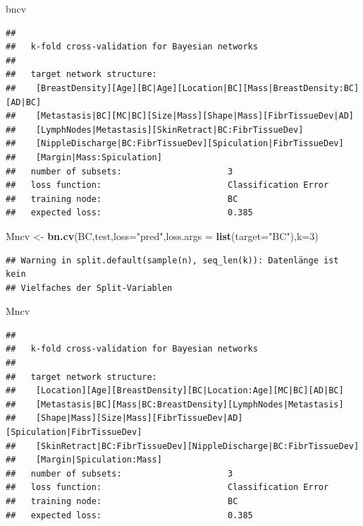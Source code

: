 \documentclass[]{article}
\newenvironment{Shaded}{\begin{snugshade}}{\end{snugshade}}
\newcommand{\KeywordTok}[1]{\textcolor[rgb]{0.13,0.29,0.53}{\textbf{{#1}}}}
\newcommand{\DataTypeTok}[1]{\textcolor[rgb]{0.13,0.29,0.53}{{#1}}}
\newcommand{\DecValTok}[1]{\textcolor[rgb]{0.00,0.00,0.81}{{#1}}}
\newcommand{\StringTok}[1]{\textcolor[rgb]{0.31,0.60,0.02}{{#1}}}
\newcommand{\NormalTok}[1]{{#1}}
\begin{document}
\begin{Shaded}
\begin{Highlighting}[]
\NormalTok{bncv}
\end{Highlighting}
\end{Shaded}

\begin{verbatim}
## 
##   k-fold cross-validation for Bayesian networks
## 
##   target network structure:
##    [BreastDensity][Age][BC|Age][Location|BC][Mass|BreastDensity:BC][AD|BC]
##    [Metastasis|BC][MC|BC][Size|Mass][Shape|Mass][FibrTissueDev|AD]
##    [LymphNodes|Metastasis][SkinRetract|BC:FibrTissueDev]
##    [NippleDischarge|BC:FibrTissueDev][Spiculation|FibrTissueDev]
##    [Margin|Mass:Spiculation]
##   number of subsets:                     3 
##   loss function:                         Classification Error 
##   training node:                         BC 
##   expected loss:                         0.385
\end{verbatim}

\begin{Shaded}
\begin{Highlighting}[]
\NormalTok{Mncv <-}\StringTok{ }\KeywordTok{bn.cv}\NormalTok{(BC,test,}\DataTypeTok{loss=}\StringTok{"pred"}\NormalTok{,}\DataTypeTok{loss.args =} \KeywordTok{list}\NormalTok{(}\DataTypeTok{target=}\StringTok{"BC"}\NormalTok{),}\DataTypeTok{k=}\DecValTok{3}\NormalTok{)}
\end{Highlighting}
\end{Shaded}

\begin{verbatim}
## Warning in split.default(sample(n), seq_len(k)): Datenlänge ist kein
## Vielfaches der Split-Variablen
\end{verbatim}

\begin{Shaded}
\begin{Highlighting}[]
\NormalTok{Mncv}
\end{Highlighting}
\end{Shaded}

\begin{verbatim}
## 
##   k-fold cross-validation for Bayesian networks
## 
##   target network structure:
##    [Location][Age][BreastDensity][BC|Location:Age][MC|BC][AD|BC]
##    [Metastasis|BC][Mass|BC:BreastDensity][LymphNodes|Metastasis]
##    [Shape|Mass][Size|Mass][FibrTissueDev|AD][Spiculation|FibrTissueDev]
##    [SkinRetract|BC:FibrTissueDev][NippleDischarge|BC:FibrTissueDev]
##    [Margin|Spiculation:Mass]
##   number of subsets:                     3 
##   loss function:                         Classification Error 
##   training node:                         BC 
##   expected loss:                         0.385
\end{verbatim}
\end{document}
